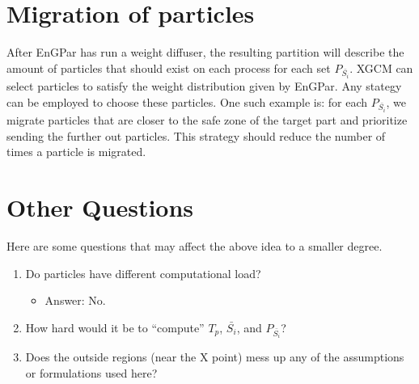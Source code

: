 \documentclass[a4paper]{article}
\begin{document}
{{  \section{Migration of particles}
  After EnGPar has run a weight diffuser, the resulting partition will
  describe the amount of particles that should exist on each process
  for each set $P_{\bar{S_i}}$. XGCM can select particles to satisfy the weight
  distribution given by EnGPar. Any stategy can be employed to choose
  these particles. One such example is: for each $P_{\bar{S_i}}$, we migrate particles
  that are closer to the safe zone of the target part and prioritize sending
  the further out particles. This strategy should reduce the number of times
  a particle is migrated.
  }
  
}

\section{Other Questions}
Here are some questions that may affect the above idea to a smaller degree.
\begin{enumerate}
\item Do particles have different computational load?
  {\color{red}
  \begin{itemize}
  \item Answer: No.
  \end{itemize}
  }
\item How hard would it be to ``compute'' $T_p$, $\bar{S_i}$, and $P_{\bar{S_i}}$?
\item Does the outside regions (near the X point) mess up any of the assumptions or formulations used here?
\end{enumerate}
\end{document}
